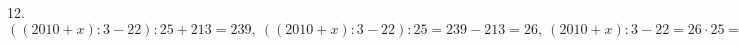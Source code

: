 12. $((2010+x):3-22):25+213=239,\ ((2010+x):3-22):25=239-213=26,\ (2010+x):3-22=26\cdot25=650,\ (2010+x):3=650+22=672,\ 2010+x=672\cdot3=2016,\ x=2016-2010=6.$\\
